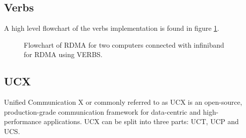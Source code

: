 \documentclass[a4paper,onecolumn]{article}
\begin{document}
\subsection{Verbs}
A high level flowchart of the verbs implementation is found in figure \ref{cpu-cpu2-demo}.
\begin{figure}[H]
\begin{center}
\caption{Flowchart of RDMA for two computers connected with infiniband for RDMA using VERBS.}
\label{cpu-cpu2-demo}
\end{center}
\end{figure}

\subsection{UCX}
Unified Communication X or commonly referred to as UCX is an open-source, production-grade communication framework for data-centric and high-performance applications. UCX can be split into three parts: UCT, UCP and UCS.
\end{document}
